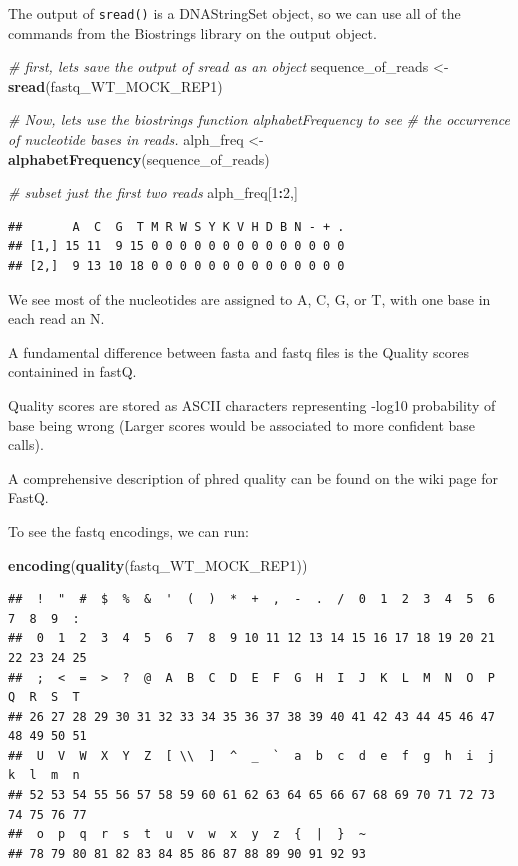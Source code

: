 \documentclass[
]{book}
\newenvironment{Shaded}{\begin{snugshade}}{\end{snugshade}}
\newcommand{\CommentTok}[1]{\textcolor[rgb]{0.56,0.35,0.01}{\textit{#1}}}
\newcommand{\DecValTok}[1]{\textcolor[rgb]{0.00,0.00,0.81}{#1}}
\newcommand{\FunctionTok}[1]{\textcolor[rgb]{0.13,0.29,0.53}{\textbf{#1}}}
\newcommand{\NormalTok}[1]{#1}
\newcommand{\OtherTok}[1]{\textcolor[rgb]{0.56,0.35,0.01}{#1}}
\newcommand{\SpecialCharTok}[1]{\textcolor[rgb]{0.81,0.36,0.00}{\textbf{#1}}}
\begin{document}
The output of \texttt{sread()} is a DNAStringSet object, so we can use all of the commands from the Biostrings library on the output object.

\begin{Shaded}
\begin{Highlighting}[]
\CommentTok{\# first, let\textquotesingle{}s save the output of sread as an object}
\NormalTok{sequence\_of\_reads }\OtherTok{\textless{}{-}} \FunctionTok{sread}\NormalTok{(fastq\_WT\_MOCK\_REP1)}

\CommentTok{\# Now, let\textquotesingle{}s use the biostrings function alphabetFrequency to see}
\CommentTok{\# the occurrence of nucleotide bases in reads.}
\NormalTok{alph\_freq }\OtherTok{\textless{}{-}} \FunctionTok{alphabetFrequency}\NormalTok{(sequence\_of\_reads)}

\CommentTok{\# subset just the first two reads}
\NormalTok{alph\_freq[}\DecValTok{1}\SpecialCharTok{:}\DecValTok{2}\NormalTok{,]}
\end{Highlighting}
\end{Shaded}

\begin{verbatim}
##       A  C  G  T M R W S Y K V H D B N - + .
## [1,] 15 11  9 15 0 0 0 0 0 0 0 0 0 0 0 0 0 0
## [2,]  9 13 10 18 0 0 0 0 0 0 0 0 0 0 0 0 0 0
\end{verbatim}

We see most of the nucleotides are assigned to A, C, G, or T, with one base in each read an N.

A fundamental difference between fasta and fastq files is the Quality scores containined in fastQ.

Quality scores are stored as ASCII characters representing -log10 probability of base being wrong (Larger scores would be associated to more confident base calls).

A comprehensive description of phred quality can be found on the wiki page for FastQ.

To see the fastq encodings, we can run:

\begin{Shaded}
\begin{Highlighting}[]
\FunctionTok{encoding}\NormalTok{(}\FunctionTok{quality}\NormalTok{(fastq\_WT\_MOCK\_REP1))}
\end{Highlighting}
\end{Shaded}

\begin{verbatim}
##  !  "  #  $  %  &  '  (  )  *  +  ,  -  .  /  0  1  2  3  4  5  6  7  8  9  : 
##  0  1  2  3  4  5  6  7  8  9 10 11 12 13 14 15 16 17 18 19 20 21 22 23 24 25 
##  ;  <  =  >  ?  @  A  B  C  D  E  F  G  H  I  J  K  L  M  N  O  P  Q  R  S  T 
## 26 27 28 29 30 31 32 33 34 35 36 37 38 39 40 41 42 43 44 45 46 47 48 49 50 51 
##  U  V  W  X  Y  Z  [ \\  ]  ^  _  `  a  b  c  d  e  f  g  h  i  j  k  l  m  n 
## 52 53 54 55 56 57 58 59 60 61 62 63 64 65 66 67 68 69 70 71 72 73 74 75 76 77 
##  o  p  q  r  s  t  u  v  w  x  y  z  {  |  }  ~ 
## 78 79 80 81 82 83 84 85 86 87 88 89 90 91 92 93
\end{verbatim}
\end{document}
